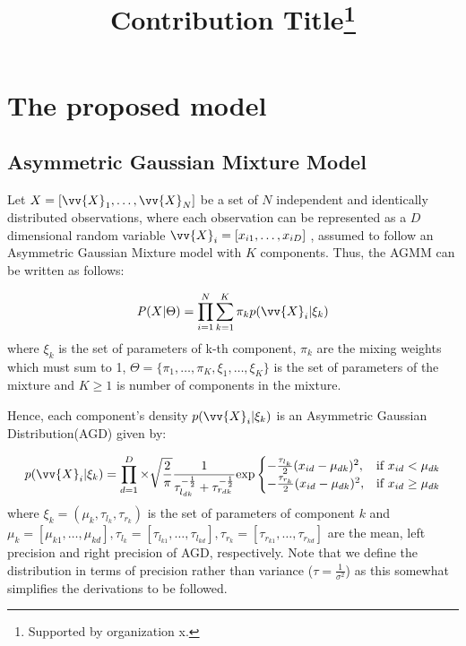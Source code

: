 \documentclass[runningheads]{llncs}
\begin{document}
%

\title{Contribution Title\thanks{Supported by organization x.}}

\section{The proposed model}

\subsection{Asymmetric Gaussian Mixture Model}
Let $X= [\vv{X}_{1},\dots, \vv{X}_{N}]$ be a set of $N$ independent and identically distributed observations, where each
observation can be represented as a $D$ dimensional random variable 
$\vv{X}_{i}= [x_{i1},\dots, x_{iD}] $ , assumed to follow an Asymmetric Gaussian Mixture model with $K$ components. Thus, the AGMM can be written as follows:

\begin{equation}
   \mathit{P}(X| \Theta) = \prod_{i=1}^{N}\sum_{k=1}^{K} \pi_{k}p(\vv{X}_{i}|\xi_{k}) 
\end{equation}
where 
$\xi_{k}$ is the set of parameters of k-th component,
$\pi_{k}$ are the mixing weights which must sum to 1,
$\Theta = \{\pi_{1},\dots,\pi_{K},\xi_{1},\dots,\xi_{K}\}$ is the set of parameters of the mixture and 
$K\geqslant{1}$  is number of components in the mixture.

Hence, each component's density $p(\vv{X}_{i}|\xi_{k})$  is an Asymmetric Gaussian Distribution(AGD) given by: 

\begin{equation}
   p(\vv{X}_{i}|\xi_{k}) = \prod_{d=1}^{D}\times\sqrt{\frac{2}{\pi}}\frac{1}{\tau_{l_{dk}}^{-\frac{1}{2}}+\tau_{r_{dk}}^{-\frac{1}{2}}} \text{exp}
   \begin{cases}
      -\frac{\tau_{l_k}}{2}(x_{id}-\mu_{dk})^2,& \text{if } x_{id}<\mu_{dk}
      \\-\frac{\tau_{r_k}}{2}(x_{id}-\mu_{dk})^2,& \text{if } x_{id}\geq\mu_{dk}

   \end{cases}
\end{equation}
where $\xi_{k} = (\mu_{k},\tau_{l_k},\tau_{r_k})$ is the set of parameters of component $k$ and 
$\mu_{k} = [\mu_{k1},\dots,\mu_{kd}],\tau_{l_k} = [\tau_{l_{k1}},\dots,\tau_{l_{kd}}],\tau_{r_k} = [\tau_{r_{k1}},\dots,\tau_{r_{kd}}]$
are the mean, left precision and right precision of AGD, respectively.
Note that we define the distribution in terms of precision rather than variance ($\tau=\frac{1}{\sigma^2}$) as this somewhat simplifies the derivations to be followed.
 
\end{document}

